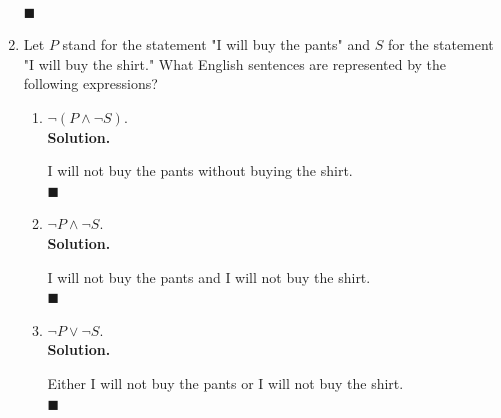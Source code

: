 \documentclass{report}
\newcommand{\sol}{\vspace{1em}\\\textbf{Solution.}\vspace{0.5em}}
\newcommand{\qed}{‎\\‎\hfill$\blacksquare$\vspace{1em}}
\begin{document}
\begin{enumerate}[leftmargin=*]
\begin{enumerate}
          \end{enumerate}\vspace{-2em}‎\qed

    \item Let $P$ stand for the statement "I will buy the pants" and $S$ for the
          statement "I will buy the shirt." What English sentences are represented by the
          following expressions?
          \begin{enumerate}
              \item $\neg(P \wedge \neg S)$.
                    \sol{}

                    I will not buy the pants without buying the shirt. \qed

              \item $\neg P \wedge \neg S$.
                    \sol{}

                    I will not buy the pants and I will not buy the shirt. \qed

              \item $\neg P \vee \neg S$.
                    \sol{}

                    Either I will not buy the pants or I will not buy the shirt. \qed
          \end{enumerate}


\end{enumerate}
\end{document}
